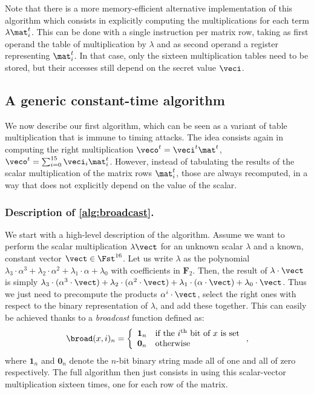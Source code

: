 Note that there is a more memory-efficient alternative implementation of this algorithm which consists in explicitly computing the multiplications for each term $\lambda\mat^t_i$.
This can be done with a single \pshufb instruction per matrix row, taking as first operand the table of multiplication by $\lambda$ and as second operand a register representing $\mat^t_i$.
In that case, only the sixteen multiplication tables need to be stored, but their accesses
still depend on the secret value $\veci$.


\subsection{A generic constant-time algorithm}
\label{bbased}
We now describe our first algorithm, which can be seen as a variant of table multiplication that is immune to timing attacks.
The idea consists again in computing the right multiplication $\veco^t = \veci^t\mat^t$, \ie{} $\veco^t = \sum_{i = 0}^{15} \veci_i\mat^t_i$. However, instead of tabulating
the results of the scalar multiplication of the matrix rows $\mat^t_i$, those are always recomputed, in a way that does not explicitly depend on the value of the scalar.

\subsubsection{Description of \autoref{alg:broadcast}.}
We start with a high-level description of the algorithm.
Assume we want to perform the scalar multiplication $\lambda\vect$ for an unknown scalar $\lambda$ and a known, constant vector $\vect \in \Fst^{16}$.
Let us write $\lambda$ as the polynomial
$\lambda_3\cdot \alpha^3 + \lambda_2\cdot \alpha^2 + \lambda_1\cdot \alpha + \lambda_0$ with coefficients in $\mathbf{F}_2$.
Then, the result of $\lambda\cdot\vect$ is simply $\lambda_3\cdot(\alpha^3\cdot\vect) + \lambda_2\cdot(\alpha^2\cdot\vect) + \lambda_1\cdot(\alpha\cdot\vect) + \lambda_0\cdot\vect$.
Thus we just need to precompute the products $\alpha^i\cdot\vect$, select the right ones with respect to the binary representation
of $\lambda$, and add these together.
This can easily be achieved thanks to a \emph{broadcast} function defined as:
\[
\broad(x,i)_n = \left\{
				\begin{array}{ll}
				\mathbf{1}_n  & \text{if the $i^\text{th}$ bit of $x$ is set}\\
				\mathbf{0}_n & \text{otherwise}
				\end{array}
	    \right.,
\]
where $\mathbf{1}_n$ and $\mathbf{0}_n$ denote the $n$-bit binary string made all of one and all of zero respectively.
The full algorithm then just consists in using this
scalar-vector multiplication sixteen times, one for each row of the matrix.

